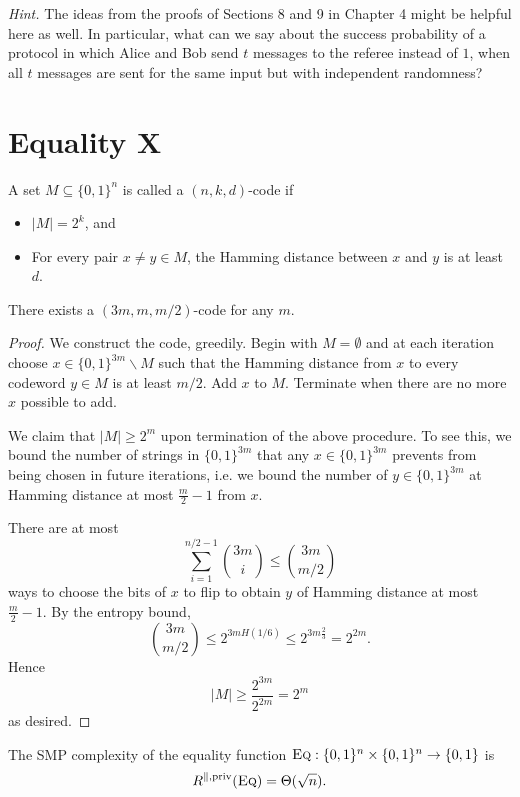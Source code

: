\bigskip
\noindent \emph{Hint.} The ideas from the proofs of Sections 8 and 9 in Chapter 4 might be helpful here as well. In particular, what can we say about the success probability of a protocol in which Alice and Bob send $t$ messages to the referee instead of $1$, when all $t$ messages are sent for the same input but with independent randomness?


\newpage 
\section{Equality X}

\begin{definition}
	A set $M \subseteq \{0,1\}^n$ is called a $(n,k,d)$-code if
	\begin{itemize}
		\item $|M| = 2^k$, and 
		\item For every pair $x\neq y \in M$, the Hamming distance between $x$ and $y$ is at least $d$.
	\end{itemize}
\end{definition}

\begin{lemma}\label{lemma:code}
There exists a $(3m,m,m/2)$-code for any $m$.
\end{lemma}

\begin{proof}
We construct the code, greedily. Begin with $M= \emptyset$ and at each iteration choose $x\in \{0,1\}^{3m}\backslash M$ such that the Hamming distance from $x$ to every codeword $y \in M$ is at least $m/2$. Add $x$ to $M$. Terminate when there are no more $x$ possible to add.

We claim that $|M| \geq 2^m$ upon termination of the above procedure. To see this, we bound the number of strings in $\{0,1\}^{3m}$ that any $x \in \{0,1\}^{3m}$ prevents from being chosen in future iterations, i.e. we bound the number of $y \in \{0,1\}^{3m}$ at Hamming distance at most $\frac{m}{2}-1$ from $x$.

There are at most 
$$\sum_{i=1}^{n/2 - 1} {3m \choose i} \leq {3m \choose m/2}$$
ways to choose the bits of $x$ to flip to obtain $y$ of Hamming distance at most $\frac{m}{2} - 1$. By the entropy bound,
$${3m\choose m/2} \leq 2^{3m H(1/6)} \leq 2^{3m\frac{2}{3}} = 2^{2m}.$$
Hence 
$$|M| \geq \frac{2^{3m}}{2^{2m}} =2^m$$
as desired.
\end{proof}


\begin{theorem}
The SMP complexity of the equality function $\textsc{Eq} : \{0,1\}^n \times \{0,1\}^n \to \{0,1\}$ is
\[
R^{\parallel,\mathrm{priv}}(\textsc{Eq}) = \Theta(\sqrt{n}).
\]
\end{theorem}

